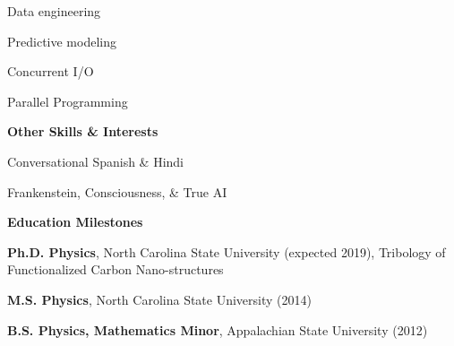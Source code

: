 \documentclass[letterpaper,final]{memoir}
\newcommand{\LargeSep}{\vspace{1.3em}}
\newcommand{\Sep}{\vspace{1.0em}}
\newcommand{\SmallSep}{\vspace{0.4em}}
\newcommand{\CVSection}[1]
	{\LARGE\textbf{#1}\par
	\SmallSep\normalsize}
\newcommand{\CVItem}[1]
	{\textbf{\color{Blue} #1}}
\begin{document}
\begin{multicols}{4}

    \begin{compactitem}[\color{Blue}$\circ$]

        \item Data engineering
        \SmallSep

        \item Predictive modeling
        \SmallSep
   
        \item Concurrent I/O
        \SmallSep

        \item Parallel Programming
        
	\end{compactitem}

\end{multicols}

\Sep
\CVItem{Other Skills \& Interests}
\SmallSep

\begin{multicols}{2}

    \begin{compactitem}[\color{Blue}$\circ$] 
        
        \item Conversational Spanish \& Hindi
        
        \SmallSep
        \item Frankenstein, Consciousness, \& True AI
        

	\end{compactitem}
\end{multicols}
\LargeSep


\notoserif \CVSection{Education Milestones}
\normalfont
\Sep
\begin{compactitem}[\color{Blue}$\circ$]

\item \textbf{Ph.D. Physics}, North Carolina State University (expected 2019), Tribology of Functionalized Carbon Nano-structures
\SmallSep

\item \textbf{M.S. Physics}, North Carolina State University (2014)
\SmallSep

\item \textbf{B.S. Physics, Mathematics Minor}, Appalachian State University (2012)

\end{compactitem}
\Sep
\end{document}
